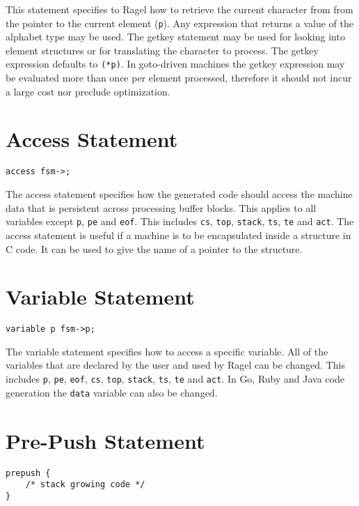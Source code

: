 \documentclass[letterpaper,11pt,oneside]{book}
\newcommand{\verbspace}{\vspace{10pt}}
\begin{document}
This statement specifies to Ragel how to retrieve the current character from 
from the pointer to the current element (\verb|p|). Any expression that returns
a value of the alphabet type
may be used. The getkey statement may be used for looking into element
structures or for translating the character to process. The getkey expression
defaults to \verb|(*p)|. In goto-driven machines the getkey expression may be
evaluated more than once per element processed, therefore it should not incur a
large cost nor preclude optimization.

\section{Access Statement}

\begin{verbatim}
access fsm->;
\end{verbatim}
\verbspace

The access statement specifies how the generated code should
access the machine data that is persistent across processing buffer blocks.
This applies to all variables except \verb|p|, \verb|pe| and \verb|eof|. This includes
\verb|cs|, \verb|top|, \verb|stack|, \verb|ts|, \verb|te| and \verb|act|.
The access statement is useful if a machine is to be encapsulated inside a
structure in C code. It can be used to give the name of
a pointer to the structure.

\section{Variable Statement}

\begin{verbatim}
variable p fsm->p;
\end{verbatim}
\verbspace

The variable statement specifies how to access a specific
variable. All of the variables that are declared by the user and
used by Ragel can be changed. This includes \verb|p|, \verb|pe|, \verb|eof|, \verb|cs|,
\verb|top|, \verb|stack|, \verb|ts|, \verb|te| and \verb|act|.
In Go, Ruby and Java code generation the \verb|data| variable can also be changed.

\section{Pre-Push Statement}
\label{prepush}

\begin{verbatim}
prepush { 
    /* stack growing code */
}
\end{verbatim}
\verbspace
\end{document}
